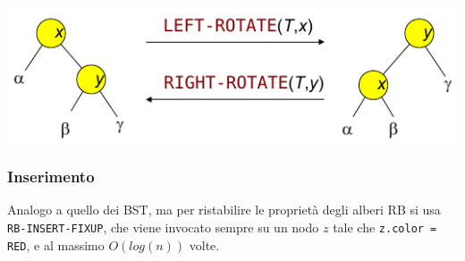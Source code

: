 \documentclass[10pt,a4paper]{article}
\newcommand{\code}{\texttt}
\begin{document}
\begin{multicols*}{2}
\centering
\vspace{1em}
\includegraphics[width=\linewidth, scale=0.9]{rb_rotations.png}
\justifying

\columnbreak

\subsubsection*{Inserimento}
Analogo a quello dei BST, ma per ristabilire le proprietà degli alberi RB si usa \code{RB-INSERT-FIXUP}, che viene invocato sempre su un nodo $z$ tale che \code{z.color = RED}, e al massimo $O(log(n))$ volte.


\end{multicols*}
\end{document}
